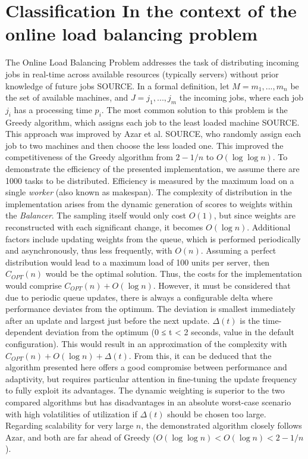 \documentclass[twocolumn]{webofc}
\begin{document}
\section{Classification In the context of the online load balancing problem}
The Online Load Balancing Problem addresses the task of distributing incoming jobs in real-time across available resources (typically servers) without prior knowledge of future jobs {\color{red} SOURCE}. In a formal definition, let \( M = {m_1, ..., m_n} \) be the set of available machines, and \( J = {j_1, ..., j_m} \) the incoming jobs, where each job $j_i$ has a processing time $p_i$. The most common solution to this problem is the Greedy algorithm, which assigns each job to the least loaded machine {\color{red} SOURCE}. This approach was improved by Azar et al. {\color{red} SOURCE}, who randomly assign each job to two machines and then choose the less loaded one. This improved the competitiveness of the Greedy algorithm from $2 - 1/n$ to $O(\log \log n)$. To demonstrate the efficiency of the presented implementation, we assume there are 1000 tasks to be distributed. Efficiency is measured by the maximum load on a single \textit{worker} (also known as makespan). The complexity of distribution in the implementation arises from the dynamic generation of scores to weights within the \textit{Balancer}. The sampling itself would only cost $O(1)$, but since weights are reconstructed with each significant change, it becomes $O(\log n)$. Additional factors include updating weights from the queue, which is performed periodically and asynchronously, thus less frequently, with $O(n)$. Assuming a perfect distribution would lead to a maximum load of 100 units per server, then $C_{OPT}(n)$ would be the optimal solution. Thus, the costs for the implementation would comprise $C_{OPT}(n) + O(\log n)$. However, it must be considered that due to periodic queue updates, there is always a configurable delta where performance deviates from the optimum. The deviation is smallest immediately after an update and largest just before the next update. $\Delta(t)$ is the time-dependent deviation from the optimum (0 ≤ t < 2 seconds, value in the default configuration). This would result in an approximation of the complexity with $C_{OPT}(n) + O(\log n) + \Delta(t)$. From this, it can be deduced that the algorithm presented here offers a good compromise between performance and adaptivity, but requires particular attention in fine-tuning the update frequency to fully exploit its advantages. The dynamic weighting is superior to the two compared algorithms but has disadvantages in an absolute worst-case scenario with high volatilities of utilization if $\Delta(t)$ should be chosen too large. Regarding scalability for very large $n$, the demonstrated algorithm closely follows Azar, and both are far ahead of Greedy ($O(\log \log n) < O(\log n) < 2 - 1/n$).
\end{document}
